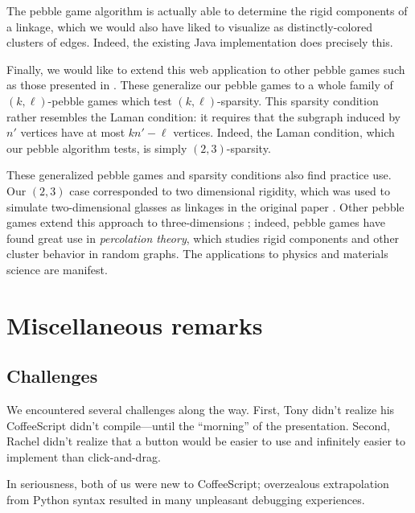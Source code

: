 \documentclass[aps,prd,final,twocolumn,letterpaper,nofootinbib]{revtex4-1}
\begin{document}
The pebble game algorithm is actually able to determine
the rigid components of a linkage,
which we would also have liked to visualize
as distinctly-colored clusters of edges.
Indeed, the existing Java implementation does precisely this.

Finally, we would like to extend this web application to other pebble games
such as those presented in \cite{lee08}.
These generalize our pebble games to a whole family of $(k,\ell)$-pebble games
which test $(k,\ell)$-sparsity.
This sparsity condition rather resembles the Laman condition:
it requires that the subgraph induced by $n'$ vertices have at most $kn' - \ell$ vertices.
Indeed, the Laman condition, which our pebble algorithm tests,
is simply $(2,3)$-sparsity.

These generalized pebble games and sparsity conditions
also find practice use.
Our $(2,3)$ case corresponded to two dimensional rigidity,
which was used to simulate two-dimensional glasses
as linkages in the original paper \cite{jacobs97}.
Other pebble games extend this approach to three-dimensions \cite{chubynsky07};
indeed, pebble games have found great use in \emph{percolation theory},
which studies rigid components and other cluster behavior in random graphs.
The applications to physics and materials science are manifest.



\appendix*
\section{Miscellaneous remarks}

\subsection{Challenges}

We encountered several challenges along the way.
First, Tony didn't realize his CoffeeScript didn't compile---until the ``morning''
of the presentation.
Second, Rachel didn't realize that a button would be easier to use
and infinitely easier to implement than click-and-drag.

In seriousness, both of us were new to CoffeeScript;
overzealous extrapolation from Python syntax resulted
in many unpleasant debugging experiences.
\end{document}
